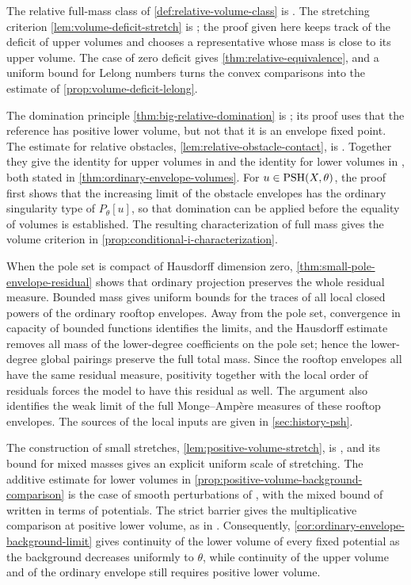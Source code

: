 The relative full-mass class of \cref{def:relative-volume-class} is \cite[v1, Definition 3.2]{XL26}. The stretching criterion \cref{lem:volume-deficit-stretch} is \cite[v1, Lemma 3.1]{XL26}; the proof given here keeps track of the deficit of upper volumes and chooses a representative whose mass is close to its upper volume. The case of zero deficit gives \cref{thm:relative-equivalence}, and a uniform bound for Lelong numbers turns the convex comparisons into the estimate of \cref{prop:volume-deficit-lelong}.

The domination principle \cref{thm:big-relative-domination} is \cite[v1, Proposition 3.2]{XL26}; its proof uses that the reference has positive lower volume, but not that it is an envelope fixed point. The estimate for relative obstacles, \cref{lem:relative-obstacle-contact}, is \cite[v1, Proposition 3.3]{XL26}. Together they give the identity for upper volumes in \cite[v1, Lemma 3.2]{XL26} and the identity for lower volumes in \cite[v1, Corollary 3.3]{XL26}, both stated in \cref{thm:ordinary-envelope-volumes}. For $u\in\mathrm{PSH}(X,\theta)$, the proof first shows that the increasing limit of the obstacle envelopes has the ordinary singularity type of $P_\theta[u]$, so that domination can be applied before the equality of volumes is established. The resulting characterization of full mass gives the volume criterion in \cref{prop:conditional-i-characterization}.

When the pole set is compact of Hausdorff dimension zero, \cref{thm:small-pole-envelope-residual} shows that ordinary projection preserves the whole residual measure. Bounded mass gives uniform bounds for the traces of all local closed powers of the ordinary rooftop envelopes. Away from the pole set, convergence in capacity of bounded functions identifies the limits, and the Hausdorff estimate removes all mass of the lower-degree coefficients on the pole set; hence the lower-degree global pairings preserve the full total mass. Since the rooftop envelopes all have the same residual measure, positivity together with the local order of residuals forces the model to have this residual as well. The argument also identifies the weak limit of the full Monge--Amp\`ere measures of these rooftop envelopes. The sources of the local inputs are given in \cref{sec:history-psh}.

The construction of small stretches, \cref{lem:positive-volume-stretch}, is \cite[v1, Proposition 3.1]{XL26}, and its bound for mixed masses gives an explicit uniform scale of stretching. The additive estimate for lower volumes in \cref{prop:positive-volume-background-comparison} is the case of smooth perturbations of \cite[Proposition 3.3(ii)]{BGL25}, with the mixed bound of \cite[Lemma 2.4]{BGL25} written in terms of potentials. The strict barrier gives the multiplicative comparison at positive lower volume, as in \cite[v1, Proposition 3.5(ii), Step 1]{XL26}. Consequently, \cref{cor:ordinary-envelope-background-limit} gives continuity of the lower volume of every fixed potential as the background decreases uniformly to $\theta$, while continuity of the upper volume and of the ordinary envelope still requires positive lower volume.

